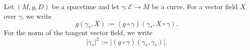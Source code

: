 Let $(M, g, D)$ be a spacetime and let $\gamma: \mathcal{E} \rightarrow M$ be a curve. For a vector field $X$ over $\gamma$, we write
$$g(\gamma_*, X) := (g \circ \gamma)(\gamma_*, X \circ \gamma).$$
For the norm of the tangent vector field, we write
$$|\gamma_*|^2 := |(g \circ \gamma)(\gamma_*, \gamma_*)|.$$
